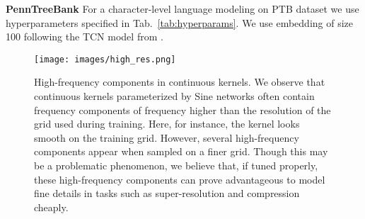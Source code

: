\documentclass{article}
\begin{document}
\textbf{PennTreeBank} For a character-level language modeling on PTB dataset we use hyperparameters specified in Tab.~\ref{tab:hyperparams}. We use embedding of size 100 following the TCN model from \cite{bai2018empirical}.

\begin{table}[t]
\centering
\caption{Hyperparameter values for experiments on irregularly sampled data. Non-listed parameters correspond to those in Tab.~\ref{tab:hyperparams}.}
\label{tab:hyperparams_irreg}
\begin{center}
\vskip -3mm
\begin{small}
\end{small}
\end{center}
\vspace{-5.0mm}
\end{table}

 \begin{figure}
     \centering
     \texttt{[image: images/high\_res.png]}
     \vspace{-2mm}
     \caption{High-frequency components in  continuous kernels. We observe that continuous kernels parameterized by Sine networks often contain frequency components of frequency higher than the resolution of the grid used during training. Here, for instance, the kernel looks smooth on the training grid. However, several high-frequency components appear when sampled on a finer grid. Though this may be a problematic phenomenon, we believe that, if tuned properly, these high-frequency components can prove advantageous to model fine details in tasks such as super-resolution and compression cheaply.
     \vspace{-4mm}}
     \label{fig:high_freq}
 \end{figure}
\end{document}
